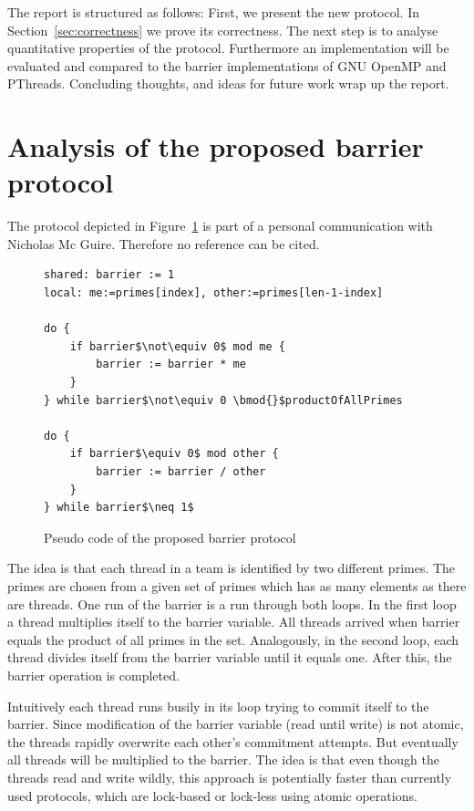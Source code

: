 \documentclass[a4paper, 10pt]{article}
\begin{document}
The report is structured as follows: First, we present the new protocol. In Section~\ref{sec:correctness} we prove its correctness. The next step is to analyse quantitative properties of the protocol. Furthermore an implementation will be evaluated and compared to the barrier implementations of GNU OpenMP\cite{gomp} and PThreads\cite{glibc}. Concluding thoughts, and ideas for future work wrap up the report.

\section{Analysis of the proposed barrier protocol}
The protocol depicted in Figure~\ref{fig:original-barrier-source-code} is part of a personal communication with Nicholas Mc Guire. Therefore no reference can be cited.

\begin{figure}[htbp]
	\centering
	\begin{lstlisting}[mathescape]
shared: barrier := 1
local: me:=primes[index], other:=primes[len-1-index]

do {
	if barrier$\not\equiv 0$ mod me {
		barrier := barrier * me
	}
} while barrier$\not\equiv 0 \bmod{}$productOfAllPrimes

do {
	if barrier$\equiv 0$ mod other {
		barrier := barrier / other
	}
} while barrier$\neq 1$
	\end{lstlisting}
	\caption{Pseudo code of the proposed barrier protocol}
	\label{fig:original-barrier-source-code}
\end{figure}
The idea is that each thread in a team is identified by two different primes. The primes are chosen from a given set of primes which has
as many elements as there are threads. One run of the barrier is a run through both loops. In the first loop a thread multiplies itself to the barrier variable. All threads arrived when barrier equals the product of all primes in the set. Analogously, in the second loop, each thread divides itself from the barrier variable until it equals one. After this, the barrier operation is completed.

Intuitively each thread runs busily in its loop trying to commit itself to the barrier. Since modification of the barrier variable (read until write) is not atomic, the threads rapidly overwrite each other's commitment attempts. But eventually all threads will be multiplied to the barrier. The idea is that even though the threads read and write wildly, this approach is potentially faster than currently used protocols, which are lock-based or lock-less using atomic operations.
\end{document}
